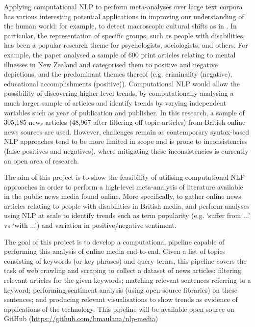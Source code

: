 \documentclass{report}
\begin{document}
Applying computational NLP to perform meta-analyses over large text corpora has various interesting potential applications in improving our understanding of the human world: for example, to detect macroscopic cultural shifts as in \cite{lansdall2017content}.
In particular, the representation of specific groups, such as people with disabilities, has been a popular research theme for psychologists, sociologists, and others.
For example, the paper \cite{coverdale2002depictions} analysed a sample of 600 print articles relating to mental illnesses in New Zealand and categorised them to positive and negative depictions, and the predominant themes thereof (e.g. criminality (negative), educational accomplishments (positive)).
Computational NLP would allow the possibility of discovering higher-level trends, by computationally analysing a much larger sample of articles and identify trends by varying independent variables such as year of publication and publisher.
In this research, a sample of 305,185 news articles (48,967 after filtering off-topic articles) from British online news sources are used.
However, challenges remain as contemporary syntax-based NLP approaches tend to be more limited in scope and is prone to inconsistencies (false positives and negatives), where mitigating these inconsistencies is currently an open area of research.

The aim of this project is to show the feasibility of utilising computational NLP approaches in order to perform a high-level meta-analysis of literature available in the public news media found online.
More specifically, to gather online news articles relating to people with disabilities in British media, and perform analyses using NLP at scale to identify trends such as term popularity (e.g. `suffer from ...' vs `with ...') and variation in positive/negative sentiment.

The goal of this project is to develop a computational pipeline capable of performing this analysis of online media end-to-end.
Given a list of topics consisting of keywords (or key phrases) and query terms, this pipeline covers the task of web crawling and scraping to collect a dataset of news articles; filtering relevant articles for the given keywords; matching relevant sentences referring to a keyword; performing sentiment analysis (using open-source libraries) on these sentences; and producing relevant visualisations to show trends as evidence of applications of the technology.
This pipeline will be available open source on GitHub (\url{https://github.com/bmaulana/nlp-media})
\end{document}
